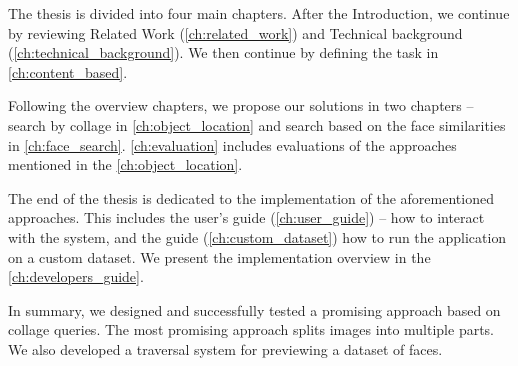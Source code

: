 The thesis is divided into four main chapters. After the Introduction, we continue by reviewing Related Work (\autoref{ch:related_work}) and Technical background (\autoref{ch:technical_background}). We then continue by defining the task in \autoref{ch:content_based}.

Following the overview chapters, we propose our solutions in two chapters -- search by collage in \autoref{ch:object_location} and search based on the face similarities in \autoref{ch:face_search}. \autoref{ch:evaluation} includes evaluations of the approaches mentioned in the \autoref{ch:object_location}.

The end of the thesis is dedicated to the implementation of the aforementioned approaches. This includes the user's guide (\autoref{ch:user_guide}) -- how to interact with the system, and the guide (\autoref{ch:custom_dataset}) how to run the application on a custom dataset. We present the implementation overview in the \autoref{ch:developers_guide}.

\bigskip

In summary, we designed and successfully tested a promising approach based on collage queries. The most promising approach splits images into multiple parts. We also developed a traversal system for previewing a dataset of faces.